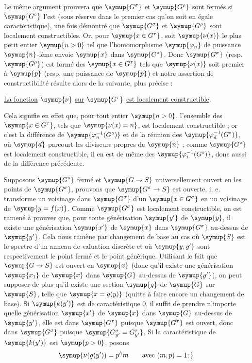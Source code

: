 Le même argument prouvera que $\symup{G^\sigma}$ et $\symup{G^\rho}$ sont fermés si $\symup{G^\circ}$
l'est (sous réserve dans le premier cas qu'on soit en égale caractéristique),
une fois démontré que $\symup{G^\sigma}$ et $\symup{G^\rho}$ sont localement constructibles.
Or, pour $\symup{x\in G^\tau}$, soit $\symup{\nu(x)}$ le plus petit entier $\symup{n>0}$ tel que
l'homomorphisme $\symup{\varphi_n}$ de puissance $\symup{n}$-ième envoie $\symup{x}$ dans $\symup{G^\circ}$,
Donc $\symup{G^\sigma}$ (resp. $\symup{G^\rho}$) est formé des $\symup{x\in G^\tau}$ tels que $\symup{\nu(x)}$ soit premier à
$\symup{p}$ (resp. une puissance de $\symup{p}$) et notre assertion de constructibilité
résulte alors de la suivante, plus précise :

 \uline{La fonction} $\symup{\nu}$ \uline{sur} $\symup{G^\tau}$ \uline{est localement constructible}.

Cela signifie en effet que, pour tout entier $\symup{n>0}$, l'ensemble des
$\symup{x\in G^\tau}$, tels que $\symup{\nu(x)=n}$, est localement constructible ; or c'est la
différence de $\symup{\varphi_n^{-1}(G^\circ)}$ et de la réunion des
$\symup{\varphi_d^{-1}(G^\circ)}$, où $\symup{d}$ parcourt les diviseurs propres de $\symup{n}$ ; comme
$\symup{G^\circ}$ est localement constructible, il en est de même des
$\symup{\varphi_i^{-1}(G^\circ)}$, donc aussi de la différence précédente.

Supposons $\symup{G^\circ}$ fermé et $\symup{G\to  S}$ universellement ouvert en les
points de $\symup{G^\sigma}$, prouvons que $\symup{G^\sigma\to  S}$ est ouverte,
i. e. transforme un voisinage dans $\symup{G^\sigma}$ d'un $\symup{x\in G^\sigma}$ en un
voisinage de $\symup{y=f(x)}$. Comme $\symup{G^\sigma}$ est localement constructible, on est
ramené à prouver que, pour toute générisation $\symup{y'}$ de $\symup{y}$, il existe une
générisation $\symup{x'}$ de $\symup{x}$ dans $\symup{G^\sigma}$ au-dessus de $\symup{y'}$. Cela nous ramène
par changement de base au cas où $\symup{S}$ est le spectre d'un anneau de valuation
discrète et où $\symup{y,y'}$ sont respectivement le point fermé et le point générique.
Utilisant le fait que $\symup{G\to  S}$ est ouvert en $\symup{x}$ (donc qu'il existe
une générisation $\symup{x_1}$ de $\symup{x}$ dans $\symup{G}$ au-dessus de $\symup{y'}$), on peut supposer de
plus qu'il existe une section $\symup{g}$ de $\symup{G}$ sur $\symup{S}$, telle que $\symup{x=g(y)}$ (quitte à
faire encore un changement de base). Si $\symup{k(y')}$ est de caractéristique 0, il
suffit de prendre n'importe quelle générisation $\symup{x'}$ de $\symup{x}$ dans $\symup{G}$ au-dessus
de $\symup{y'}$, elle est dans $\symup{G^\tau}$ puisque $\symup{G^\tau}$ est ouvert, donc dans
$\symup{G^\sigma}$ puisque $\symup{G_{y'}^\sigma=G_{y'}^\tau}$, Si la caractéristique de
$\symup{k(y')}$ est $\symup{p>0}$, posons
\[
\symup{\nu(g(y'))=p^hm\qquad\text{avec }(m,p)=1 ;}
\]


